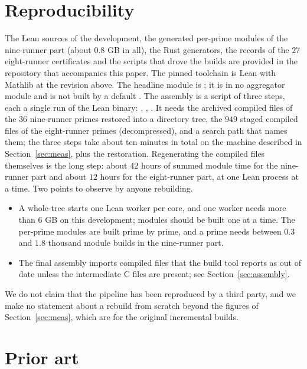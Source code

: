 \documentclass[11pt]{article}
\theoremstyle{remark}
\begin{document}
\section{Reproducibility}\label{sec:repro}

The Lean sources of the development, the generated per-prime modules of the nine-runner part (about $0.8$ GB in all), the Rust generators, the records of the $27$ eight-runner certificates and the scripts that drove the builds are provided in the repository that accompanies this paper. The pinned toolchain is Lean  with Mathlib at the revision above. The headline module is ; it is in no aggregator module and is not built by a default . The assembly is a script of three steps, each a single run of the Lean binary: , , . It needs the archived compiled files of the $36$ nine-runner primes restored into a directory tree, the $949$ staged compiled files of the eight-runner primes (decompressed), and a search path that names them; the three steps take about ten minutes in total on the machine described in Section~\ref{sec:meas}, plus the restoration. Regenerating the compiled files themselves is the long step: about $42$ hours of summed module time for the nine-runner part and about $12$ hours for the eight-runner part, at one Lean process at a time. Two points to observe by anyone rebuilding.
\begin{itemize}
\item A whole-tree  starts one Lean worker per core, and one worker needs more than $6$ GB on this development; modules should be built one at a time. The per-prime modules are built prime by prime, and a prime needs between $0.3$ and $1.8$ thousand module builds in the nine-runner part.
\item The final assembly imports compiled files that the build tool reports as out of date unless the intermediate C files are present; see Section~\ref{sec:assembly}.
\end{itemize}
We do not claim that the pipeline has been reproduced by a third party, and we make no statement about a rebuild from scratch beyond the figures of Section~\ref{sec:meas}, which are for the original incremental builds.

\section{Prior art}\label{sec:prior}
\end{document}
